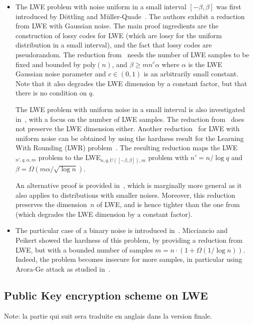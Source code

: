 \begin{itemize}
\item  The LWE problem with noise uniform in a small interval $[-\beta,\beta]$ was first introduced by Döttling and Müller-Quade~\cite{DMQ13}. The authors exhibit a reduction from LWE with Gaussian noise. The main proof ingredients are the construction of lossy codes for LWE (which are lossy for the uniform distribution in a small interval), and the fact that lossy codes are pseudorandom. The reduction from~\cite{DMQ13} needs the number of LWE samples to be fixed and bounded by poly$(n)$, and $\beta \geq m n^c \alpha$ where  $\alpha$ is the LWE Gaussian noise parameter and $c \in (0,1)$ is an arbitrarily small constant. Note that it also degrades the LWE dimension by a constant factor, but that there is no condition on $q$. 

The LWE problem with uniform noise in a small interval is also investigated in~\cite{MP13}, with a focus on the number of LWE samples. The reduction from~\cite{MP13} does not preserve the LWE dimension either.
Another reduction~\cite{BGMRR16} for LWE with uniform noise can be obtained by using the hardness result for the Learning With Rounding (LWR) problem~\cite{BPR12}. The resulting reduction maps the LWE$_{n',q,\alpha,m}$ problem to the LWE$_{n,q,U([-\beta,\beta]),m}$ problem with $n'=n/\log q $ and $\beta= \Omega(m \alpha/\sqrt{\log n})$. 

An alternative proof is provided in~\cite{BLLSS15}, which is marginally more general as it also applies to distributions with smaller noises.
Moreover, this reduction preserves the dimension~$n$ of LWE, and is hence tighter than the one from~\cite{DMQ13} (which degrades the LWE dimension by a constant factor).
\item The particular case of a binary noise is introduced in~\cite{MP13}. Micciancio and Peikert showed the hardness of this problem, by providing a reduction from LWE, but with a bounded number of samples $m=n \cdot (1+ \Omega(1/ \log n))$. Indeed, the problem becomes insecure for more samples, in particular using Arora-Ge attack as studied in~\cite{AG11,BGPW16}.
\end{itemize}




\subsection{Public Key encryption scheme on LWE}


Note: la partie qui suit sera traduite en anglais dans la version finale.


